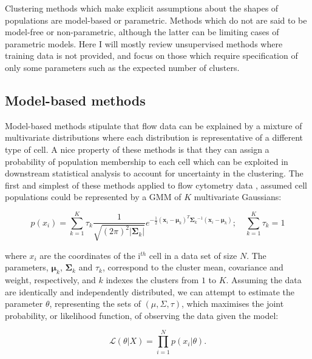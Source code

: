 Clustering methods which make explicit assumptions about the shapes of populations are model-based or parametric.
Methods which do not are said to be model-free or non-parametric,
although the latter can be limiting cases of parametric models.
Here I will mostly review unsupervised methods where training data is not provided,
and focus on those which require specification of only some parameters such as the expected
number of clusters.

\subsection{Model-based methods}

Model-based methods stipulate that flow data can be explained by a mixture of multivariate distributions where each distribution is representative of a different type of cell.
A nice property of these methods is that they can assign a probability of population membership to each cell which can be exploited in downstream statistical analysis to account for uncertainty in the clustering.
The first and simplest of these methods applied to flow cytometry data \citep{Chan:2008gq}, assumed cell populations could be represented by
a \acrfull{GMM} of $K$ multivariate Gaussians:

\[
p(x_i) = \sum_{k=1}^K\tau_k \frac{1}{\sqrt{(2\pi)^2|\boldsymbol\Sigma_k|}}
e^{-\frac{1}{2}({\mathbf x_i}-{\boldsymbol\mu_k})^T{\boldsymbol\Sigma_k}^{-1}({\mathbf x_i}-{\boldsymbol\mu_k})
}; \quad \sum_{k=1}^K\tau_k = 1
\]

where $x_i$ are the coordinates of the i$^{th}$ cell in a data set of size $N$.
The parameters, $\boldsymbol\mu_k$, $\boldsymbol\Sigma_k$ and $\tau_k$,
correspond to the cluster mean, covariance and weight, respectively, and $k$ indexes the clusters from $1$ to $K$.
Assuming the data are identically and independently distributed, we can attempt to estimate
the parameter $\theta$, representing the sets of $(\mu, \Sigma, \tau)$, which maximises the joint probability,
or likelihood function, of observing the data given the model:

\[
\mathcal{L}(\theta |X) = \prod_{i=1}^N p(x_i|\theta).
\]


